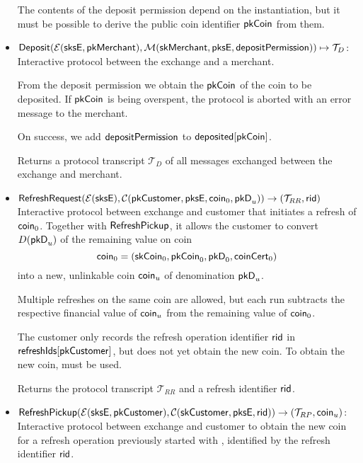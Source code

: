 \begin{itemize}
    The contents of the deposit permission depend on the instantiation, but it
    must be possible to derive the public coin identifier $\mathsf{pkCoin}$ from
    them.

  \item $\mathsf{Deposit}(\mathcal{E}(\mathsf{sksE}, \mathsf{pkMerchant}), \mathcal{M}(\mathsf{skMerchant}, \mathsf{pksE}, \mathsf{depositPermission})) \mapsto \mathcal{T}_D$:
    Interactive protocol between the exchange and a merchant.

    From the deposit permission we obtain the $\mathsf{pkCoin}$ of the coin to be
    deposited.  If $\mathsf{pkCoin}$ is being overspent, the protocol is aborted with
    an error message to the merchant.

    On success, we add $\mathsf{depositPermission}$ to $\mathsf{deposited}[\mathsf{pkCoin}]$.

    Returns a protocol transcript $\mathcal{T}_D$ of all messages exchanged
    between the exchange and merchant.

  \item $\mathsf{RefreshRequest}(\mathcal{E}(\mathsf{sksE}), \mathcal{C}(\mathsf{pkCustomer}, \mathsf{pksE}, \mathsf{coin}_0, \mathsf{pkD}_u))
      \rightarrow (\mathcal{T}_{RR}, \mathsf{rid})$
    Interactive protocol between exchange and customer that initiates a refresh
    of $\mathsf{coin}_0$.  Together with $\mathsf{RefreshPickup}$, it allows the
    customer to convert $D(\mathsf{pkD}_u)$ of the remaining value on coin \[
      \mathsf{coin}_0 = (\mathsf{skCoin}_0, \mathsf{pkCoin}_0, \mathsf{pkD}_0, \mathsf{coinCert}_0) \]
    into a new, unlinkable coin $\mathsf{coin}_u$ of denomination $\mathsf{pkD}_u$.

    Multiple refreshes on the same coin are allowed, but each run subtracts the
    respective financial value of $\mathsf{coin}_u$ from the remaining value of
    $\mathsf{coin}_0$.

    The customer only records the refresh operation identifier $\mathsf{rid}$ in
    $\mathsf{refreshIds}[\mathsf{pkCustomer}]$, but does not yet obtain the new coin.  To
    obtain the new coin,  must be used.

    Returns the protocol transcript $\mathcal{T}_{RR}$ and a refresh identifier $\mathsf{rid}$.

  \item $\mathsf{RefreshPickup}(\mathcal{E}(\mathsf{sksE}, \mathsf{pkCustomer}),
      \mathcal{C}(\mathsf{skCustomer}, \mathsf{pksE}, \mathsf{rid})) \rightarrow (\mathcal{T}_{RP}, \mathsf{coin}_u)$:
    Interactive protocol between exchange and customer to obtain the new coin
    for a refresh operation previously started with ,
    identified by the refresh identifier $\mathsf{rid}$.


\end{itemize}
